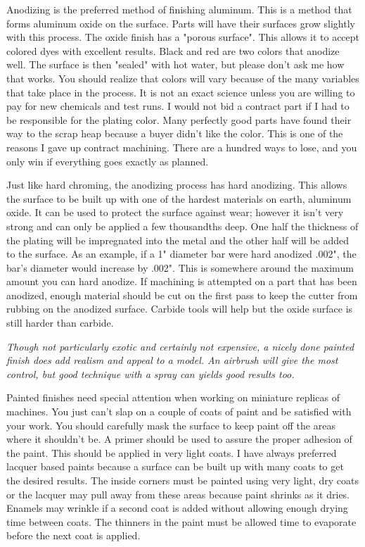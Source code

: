 
Anodizing is the preferred method of finishing aluminum. This is a method that
forms aluminum oxide on the surface. Parts will have their surfaces grow
slightly with this process. The oxide finish has a "porous surface". This allows
it to accept colored dyes with excellent results. Black and red are two colors
that anodize well. The surface is then "sealed" with hot water, but please don't
ask me how that works. You should realize that colors will vary because of the
many variables that take place in the process. It is not an exact science unless
you are willing to pay for new chemicals and test runs. I would not bid a
contract part if I had to be responsible for the plating color. Many perfectly
good parts have found their way to the scrap heap because a buyer didn't like
the color. This is one of the reasons I gave up contract machining. There are a
hundred ways to lose, and you only win if everything goes exactly as planned.


Just like hard chroming, the anodizing process has hard anodizing. This allows
the surface to be built up with one of the hardest materials on earth, aluminum
oxide. It can be used to protect the surface against wear; however it isn't very
strong and can only be applied a few thousandths deep. One half the thickness of
the plating will be impregnated into the metal and the other half will be added
to the surface. As an example, if a 1" diameter bar were hard anodized .002",
the bar's diameter would increase by .002". This is somewhere around the maximum
amount you can hard anodize. If machining is attempted on a part that has been
anodized, enough material should be cut on the first pass to keep the cutter
from rubbing on the anodized surface. Carbide tools will help but the oxide
surface is still harder than carbide.

\bigskip
\textit{Though not particularly exotic and certainly not expensive, a nicely
done painted finish does add realism and appeal to a model. An airbrush will
give the most control, but good technique with a spray can yields good results
too.}
\bigskip


Painted finishes need special attention when working on miniature replicas of
machines. You just can't slap on a couple of coats of paint and be satisfied
with your work. You should carefully mask the surface to keep paint off the
areas where it shouldn't be. A primer should be used to assure the proper
adhesion of the paint. This should be applied in very light coats. I have always
preferred lacquer based paints because a surface can be built up with many coats
to get the desired results. The inside corners must be painted using very light,
dry coats or the lacquer may pull away from these areas because paint shrinks as
it dries. Enamels may wrinkle if a second coat is added without allowing enough
drying time between coats. The thinners in the paint must be allowed time to
evaporate before the next coat is applied.

